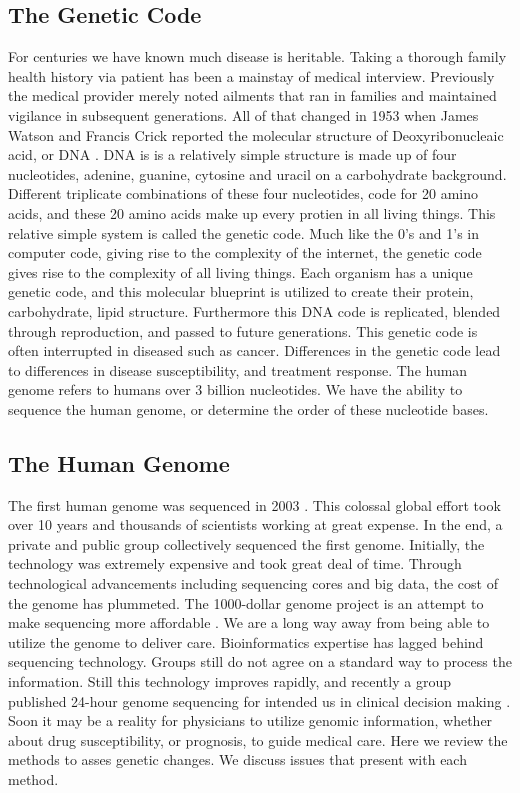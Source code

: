 \documentclass[sigconf]{acmart}
\begin{document}
\subsection{The Genetic Code}
For centuries we have known much disease is heritable. Taking a thorough family health history via patient has been a mainstay of medical interview.   Previously the medical provider merely noted ailments that ran in families and maintained vigilance in subsequent generations.  All of that changed in 1953 when James Watson and Francis Crick reported the molecular structure of Deoxyribonucleaic acid, or DNA \cite{watson1953molecular}.  DNA is is a relatively simple structure is made up of four nucleotides, adenine, guanine, cytosine and uracil on a carbohydrate background. Different triplicate combinations of these four nucleotides, code for 20 amino acids, and these 20 amino acids make up every protien in all living things.  This relative simple system is called the genetic code.  Much like the 0's and 1's in computer code, giving rise to the complexity of the internet, the genetic code gives rise to the complexity of all living things.  Each organism has a unique genetic code, and this molecular blueprint is utilized  to create their protein, carbohydrate, lipid structure.  Furthermore this DNA code is replicated, blended through reproduction, and passed to future generations.  This genetic code is often interrupted in diseased such as cancer.  Differences in the genetic code lead to differences in disease susceptibility, and treatment response.    The human genome refers to humans over 3 billion nucleotides.  We have the ability to sequence the human genome, or determine the order of these nucleotide bases. 

\subsection{The Human Genome}
    The first human genome was sequenced in 2003 \cite{collins2003human}.  This colossal global
effort took over 10 years and thousands of scientists working at great
expense.  In the end, a private and public group collectively
sequenced the first genome.  Initially, the technology was extremely
expensive and took great deal of time.  Through technological
advancements including sequencing cores and big data, the cost of the
genome has plummeted.  The 1000-dollar genome project is an attempt to
make sequencing more affordable \cite{fox6}.  We are a long way away from
being able to utilize the genome to deliver care.  Bioinformatics
expertise has lagged behind sequencing technology.  Groups still do not agree on
a standard way to process the information.  Still this technology
improves rapidly, and recently a group published 24-hour genome
sequencing for intended us in clinical decision making \cite{saunders2012rapid}. Soon it may be
a reality for physicians to utilize genomic information, whether about
drug susceptibility, or prognosis, to guide medical care.  Here we review the methods to asses genetic changes.  We discuss issues that present with each method.  
\end{document}

